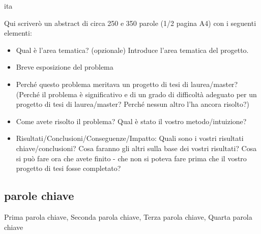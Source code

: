\markboth{\abstractname}{}
\begin{scontents}[store-env=lang]
ita
\end{scontents}
\begin{scontents}[store-env=abstracts,print-env=true]
    Qui scriverò un abstract di circa 250 e 350 parole (1/2 pagina A4) con i seguenti elementi:
    \begin{itemize}
      \item Qual è l'area tematica? (opzionale) Introduce l'area tematica del progetto.
      \item Breve esposizione del problema
      \item Perché questo problema meritava un progetto di tesi di laurea/master? (Perché il problema è significativo e di un grado di difficoltà adeguato per un progetto di tesi di laurea/master? Perché nessun altro l'ha ancora risolto?)
      \item Come avete risolto il problema? Qual è stato il vostro metodo/intuizione?
      \item Risultati/Conclusioni/Conseguenze/Impatto: Quali sono i vostri risultati chiave/\linebreak[4]conclusioni? Cosa faranno gli altri sulla base dei vostri risultati? Cosa si può fare ora che avete finito - che non si poteva fare prima che il vostro progetto di tesi fosse completato?
    \end{itemize}
\end{scontents}
\subsection*{parole chiave}
\begin{scontents}[store-env=keywords,print-env=true]
Prima parola chiave, Seconda parola chiave, Terza parola chiave, Quarta parola chiave
\end{scontents}